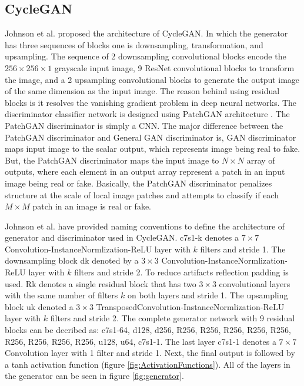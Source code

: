 \subsection{\ac{CycleGAN}}

Johnson et al.\cite{johnson2016perceptual} proposed the architecture of \ac{CycleGAN}. In which the generator has three sequences of blocks one is downsampling, transformation, and upsampling. The sequence of 2 downsampling convolutional blocks encode the $256 \times 256 \times 1$ grayscale input image, 9 \ac{ResNet} convolutional blocks to transform the image, and a 2 upsampling convolutional blocks to generate the output image of the same dimension as the input image. The reason behind using residual blocks is it resolves the vanishing gradient problem in deep neural networks. The discriminator classifier network is designed using PatchGAN architecture \cite{isola2018imagetoimage} \cite{li2016precomputed}. The PatchGAN discriminator is simply a \ac{CNN}. The major difference between the PatchGAN discriminator and General \ac{GAN} discriminator is, \ac{GAN} discriminator maps input image to the scalar output, which represents image being real to fake. But, the PatchGAN discriminator maps the input image to $N \times N$ array of outputs, where each element in an output array represent a patch in an input image being real or fake. Basically, the PatchGAN discriminator penalizes structure at the scale of local image patches and attempts to classify if each $M \times M$ patch in an image is real or fake.

Johnson et al. \cite{johnson2016perceptual} have provided naming conventions to define the architecture of generator and discriminator used in \ac{CycleGAN}. {\selectfont c7s1-k} denotes a $7 \times 7$ Convolution-InstanceNormlization-ReLU layer with $k$ filters and stride 1. The downsampling block {\selectfont dk} denoted by a $3 \times 3$ Convolution-InstanceNormlization-ReLU layer with $k$ filters and stride 2. To reduce artifacts reflection padding is used. {\selectfont Rk} denotes a single residual block that has two $3 \times 3$ convolutional layers with the same number of filters $k$ on both layers and stride 1. The upsampling block {\selectfont uk} denoted a $3 \times 3$ TransposedConvolution-InstanceNormlization-ReLU layer with $k$ filters and stride 2. The complete generator network with 9 residual blocks can be decribed as: {\selectfont c7s1-64, d128, d256, R256, R256, R256, R256, R256, R256, R256, R256, R256, u128, u64, c7s1-1}. The last layer {\selectfont c7s1-1} denotes a $7 \times 7$ Convolution layer with 1 filter and stride 1. Next, the final output is followed by a tanh activation function (figure \ref{fig:ActivationFunctions}). All of the layers in the generator can be seen in figure \ref{fig:generator}.


